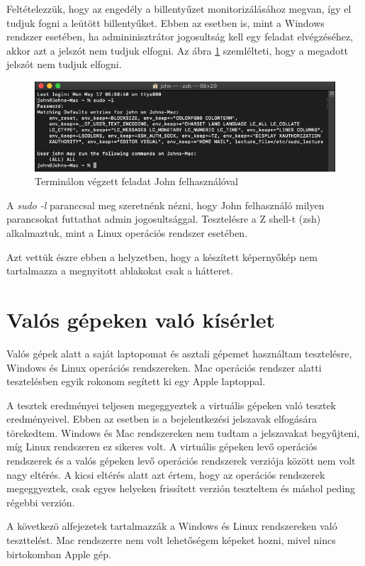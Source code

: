 \documentclass[12pt,a4paper,oneside]{report}
\begin{document}
Feltételezzük, hogy az engedély a billentyűzet monitorizálásához megvan, így el tudjuk fogni a leütött billentyűket. Ebben az esetben is, mint a Windows rendszer esetében, ha admininisztrátor jogosultság kell egy feladat elvégzéséhez, akkor azt a jelszót nem tudjuk elfogni. Az ábra \ref{fig:macVM2} szemlélteti, hogy a megadott jelszót nem tudjuk elfogni.
\begin{figure}[H]
\centering
\includegraphics[width=450pt]{../images/macVM2}
\caption{Terminálon végzett feladat John felhasználóval}
\label{fig:macVM2}
\end{figure}

A \textit{sudo -l} paranccsal meg szeretnénk nézni, hogy John felhasználó milyen parancsokat futtathat admin jogosultsággal. Tesztelésre a Z shell-t (zsh) alkalmaztuk, mint a Linux operációs rendszer esetében.

Azt vettük észre ebben a helyzetben, hogy a készített képernyőkép nem tartalmazza a megnyitott ablakokat csak a hátteret.

\section{Valós gépeken való kísérlet}
Valós gépek alatt a saját laptopomat és asztali gépemet használtam tesztelésre, Windows és Linux operációs rendszereken. Mac operációs rendszer alatti tesztelésben egyik rokonom segített ki egy Apple laptoppal.

A tesztek eredményei teljesen megeggyeztek a virtuális gépeken való tesztek eredményeivel. Ebben az esetben is a bejelentkezési jelszavak elfogására törekedtem. Windows és Mac rendszereken nem tudtam a jelszavakat begyűjteni, míg Linux rendszeren ez sikeres volt. A virtuális gépeken levő operációs rendszerek és a valós gépeken levő operációs rendszerek verziója között nem volt nagy eltérés. A kicsi eltérés alatt azt értem, hogy az operációs rendszerek megeggyeztek, csak egyes helyeken frissített verzión teszteltem és máshol peding régebbi verzión.

A következö alfejezetek tartalmazzák a Windows és Linux rendszereken való teszttelést. Mac rendszerre nem volt lehetőségem képeket hozni, mivel nincs birtokomban Apple gép.
\end{document}
